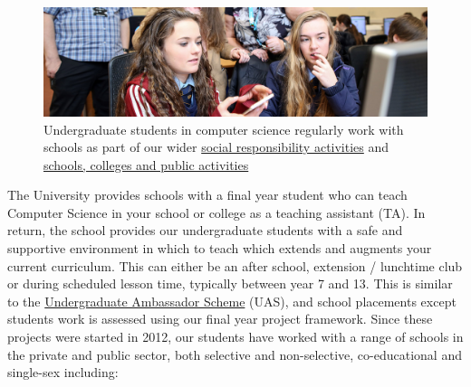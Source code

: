 \documentclass[
  12pt,
]{book}
\begin{document}
\begin{figure}

{\centering \includegraphics[width=0.98\linewidth]{images/schools-banner} 

}

\caption{Undergraduate students in computer science regularly work with schools as part of our wider \href{https://www.cs.manchester.ac.uk/connect/social-responsibility/}{social responsibility activities} \citep{m2020, m20202} and \href{https://www.cs.manchester.ac.uk/connect/schools-colleges-public/}{schools, colleges and public activities}}\label{fig:unnamed-chunk-6}
\end{figure}

The University provides schools with a final year student who can teach Computer Science in your school or college as a teaching assistant (TA). In return, the school provides our undergraduate students with a safe and supportive environment in which to teach which extends and augments your current curriculum. This can either be an after school, extension / lunchtime club or during scheduled lesson time, typically between year 7 and 13. This is similar to the \href{https://en.wikipedia.org/wiki/Undergraduate_Ambassadors_Scheme}{Undergraduate Ambassador Scheme} (UAS), \citep{uas, Cooper2005} and school placements \citep{Moller2019} except students work is assessed using our final year project framework. \citep{COMP30030, COMP30040} Since these projects were started in 2012, our students have worked with a range of schools in the private and public sector, both selective and non-selective, co-educational and single-sex including:
\end{document}
